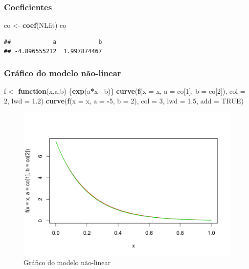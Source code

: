 \documentclass[a4paper]{article}
\newenvironment{Shaded}{\begin{snugshade}}{\end{snugshade}}
\newcommand{\KeywordTok}[1]{\textcolor[rgb]{0.13,0.29,0.53}{\textbf{#1}}}
\newcommand{\DataTypeTok}[1]{\textcolor[rgb]{0.13,0.29,0.53}{#1}}
\newcommand{\DecValTok}[1]{\textcolor[rgb]{0.00,0.00,0.81}{#1}}
\newcommand{\FloatTok}[1]{\textcolor[rgb]{0.00,0.00,0.81}{#1}}
\newcommand{\StringTok}[1]{\textcolor[rgb]{0.31,0.60,0.02}{#1}}
\newcommand{\OtherTok}[1]{\textcolor[rgb]{0.56,0.35,0.01}{#1}}
\newcommand{\ControlFlowTok}[1]{\textcolor[rgb]{0.13,0.29,0.53}{\textbf{#1}}}
\newcommand{\OperatorTok}[1]{\textcolor[rgb]{0.81,0.36,0.00}{\textbf{#1}}}
\newcommand{\NormalTok}[1]{#1}
\begin{document}
\subsubsection{Coeficientes}\label{coeficientes}

\begin{Shaded}
\begin{Highlighting}[]
\NormalTok{co <-}\StringTok{ }\KeywordTok{coef}\NormalTok{(NLfit)}
\NormalTok{co}
\end{Highlighting}
\end{Shaded}

\begin{verbatim}
##            a            b 
## -4.896555212  1.997874467
\end{verbatim}

\subsubsection{Gráfico do modelo
não-linear}\label{grafico-do-modelo-nao-linear}

\begin{Shaded}
\begin{Highlighting}[]
\NormalTok{f <-}\StringTok{ }\ControlFlowTok{function}\NormalTok{(x,a,b) \{}\KeywordTok{exp}\NormalTok{(a}\OperatorTok{*}\NormalTok{x}\OperatorTok{+}\NormalTok{b)\}}
\KeywordTok{curve}\NormalTok{(}\KeywordTok{f}\NormalTok{(}\DataTypeTok{x =}\NormalTok{ x, }\DataTypeTok{a =}\NormalTok{ co[}\DecValTok{1}\NormalTok{], }\DataTypeTok{b =}\NormalTok{ co[}\DecValTok{2}\NormalTok{]), }\DataTypeTok{col =} \DecValTok{2}\NormalTok{, }\DataTypeTok{lwd =} \FloatTok{1.2}\NormalTok{) }
\KeywordTok{curve}\NormalTok{(}\KeywordTok{f}\NormalTok{(}\DataTypeTok{x =}\NormalTok{ x, }\DataTypeTok{a =} \OperatorTok{-}\DecValTok{5}\NormalTok{, }\DataTypeTok{b =} \DecValTok{2}\NormalTok{), }\DataTypeTok{col =} \DecValTok{3}\NormalTok{, }\DataTypeTok{lwd =} \FloatTok{1.5}\NormalTok{, }\DataTypeTok{add =} \OtherTok{TRUE}\NormalTok{)}
\end{Highlighting}
\end{Shaded}

\begin{figure}[H]

{\centering \includegraphics[width=0.7\linewidth]{images/graficoNL-1} 

}

\caption{Gráfico do modelo não-linear}\label{fig:graficoNL}
\end{figure}
\end{document}

